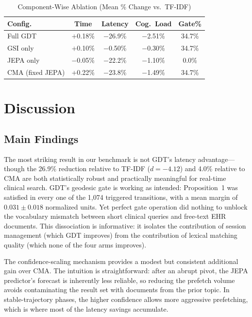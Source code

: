 \documentclass[review]{elsarticle}
\begin{document}
\begin{table}[!t]
  \centering
  \caption{Component-Wise Ablation (Mean \% Change vs.\ TF-IDF)}
  \label{tab:ablation}
  \renewcommand{\arraystretch}{1.15}
  \begin{tabular}{lcccc}
    \toprule
    \textbf{Config.}   & \textbf{Time} & \textbf{Latency} & \textbf{Cog.\ Load} & \textbf{Gate\%} \\
    \midrule
    Full GDT             & $+$0.18\%  & $-$26.9\%  & $-$2.51\% & 34.7\% \\
    GSI only             & $+$0.10\%  & $-$0.50\%  & $-$0.30\% & 34.7\% \\
    JEPA only            & $-$0.05\%  & $-$22.2\%  & $-$1.10\% & 0.0\%  \\
    CMA (fixed JEPA)     & $+$0.22\%  & $-$23.8\%  & $-$1.49\% & 34.7\% \\
    \bottomrule
  \end{tabular}
\end{table}

\section{Discussion}
\label{sec:discussion}

\subsection{Main Findings}

The most striking result in our benchmark is not GDT's latency advantage---though
the 26.9\% reduction relative to TF-IDF ($d{=}{-4.12}$) and 4.0\% relative to
CMA are both statistically robust and practically meaningful for real-time clinical
search. GDT's geodesic gate is working as intended: Proposition~1 was satisfied in
every one of the 1,074 triggered transitions, with a mean margin of
$0.031 \pm 0.018$ normalized units. Yet perfect gate operation did nothing to
unblock the vocabulary mismatch between short clinical queries and free-text EHR
documents. This dissociation is informative: it isolates the contribution of
session management (which GDT improves) from the contribution of lexical matching
quality (which none of the four arms improves).

The confidence-scaling mechanism provides a modest but consistent additional gain
over CMA. The intuition is straightforward: after an abrupt pivot, the JEPA
predictor's forecast is inherently less reliable, so reducing the prefetch volume
avoids contaminating the result set with documents from the prior topic. In
stable-trajectory phases, the higher confidence allows more aggressive prefetching,
which is where most of the latency savings accumulate.
\end{document}
